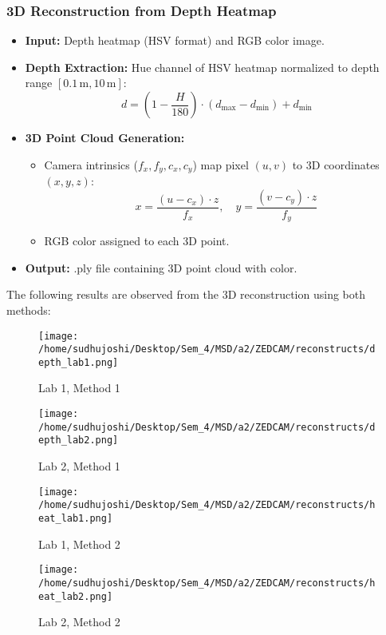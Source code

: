 \documentclass[a4paper]{article}
\begin{document}
\subsubsection*{3D Reconstruction from Depth Heatmap}
\begin{itemize}
    \item \textbf{Input:} Depth heatmap (HSV format) and RGB color image.
    \item \textbf{Depth Extraction:} Hue channel of HSV heatmap normalized to depth range \([0.1\,\text{m}, 10\,\text{m}]\):
    \[
    d = \left(1 - \frac{H}{180}\right) \cdot (d_{\text{max}} - d_{\text{min}}) + d_{\text{min}}
    \]
    \item \textbf{3D Point Cloud Generation:} 
    \begin{itemize}
        \item Camera intrinsics (\(f_x, f_y, c_x, c_y\)) map pixel \((u, v)\) to 3D coordinates \((x, y, z)\):
        \[
        x = \frac{(u - c_x) \cdot z}{f_x}, \quad y = \frac{(v - c_y) \cdot z}{f_y}
        \]
        \item RGB color assigned to each 3D point.
    \end{itemize}
    \item \textbf{Output:} .ply file containing 3D point cloud with color.
\end{itemize}

The following results are observed from the 3D reconstruction using both methods:
\begin{figure}[H]
    \centering
    \texttt{[image: /home/sudhujoshi/Desktop/Sem\_4/MSD/a2/ZEDCAM/reconstructs/depth\_lab1.png]}
    \caption{Lab 1, Method 1} 
\end{figure}
\begin{figure}[H]
    \centering
    \texttt{[image: /home/sudhujoshi/Desktop/Sem\_4/MSD/a2/ZEDCAM/reconstructs/depth\_lab2.png]}
    \caption{Lab 2, Method 1} 
\end{figure}

\begin{figure}[H]
    \centering
    \texttt{[image: /home/sudhujoshi/Desktop/Sem\_4/MSD/a2/ZEDCAM/reconstructs/heat\_lab1.png]}
    \caption{Lab 1, Method 2} 
\end{figure}
\begin{figure}[H]
    \centering
    \texttt{[image: /home/sudhujoshi/Desktop/Sem\_4/MSD/a2/ZEDCAM/reconstructs/heat\_lab2.png]}
    \caption{Lab 2, Method 2} 
\end{figure}
\end{document}
